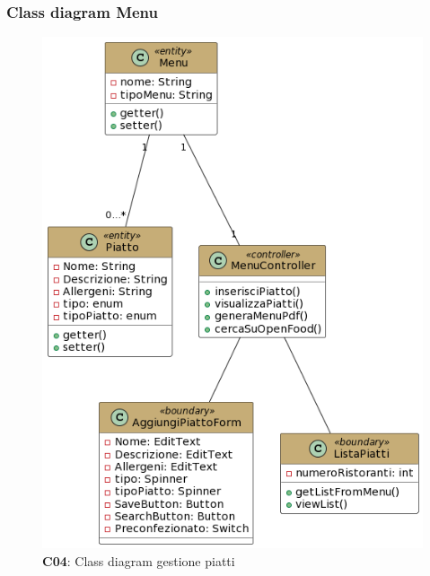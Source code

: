     \subsubsection{Class diagram Menu}
        \begin{figure}[H]
            \centering
            \includegraphics[scale=0.5]{assets/diagrammi/Class diagram di analisi/Gestione piatto.png}
            \caption{\textbf{C04}: Class diagram gestione piatti}\label{fig:Menu}
        \end{figure} 

